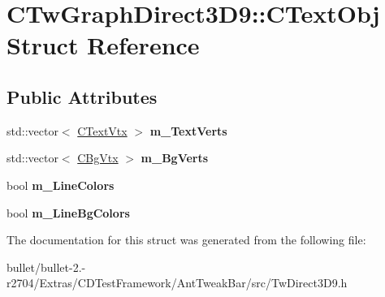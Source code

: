 \hypertarget{struct_c_tw_graph_direct3_d9_1_1_c_text_obj}{\section{C\+Tw\+Graph\+Direct3\+D9\+:\+:C\+Text\+Obj Struct Reference}
\label{struct_c_tw_graph_direct3_d9_1_1_c_text_obj}
}
\subsection*{Public Attributes}
\begin{DoxyCompactItemize}
\item 
\hypertarget{struct_c_tw_graph_direct3_d9_1_1_c_text_obj_a95426ab1f9d1fb9fe9de326e4a86d603}{std\+::vector$<$ \hyperlink{struct_c_tw_graph_direct3_d9_1_1_c_text_vtx}{C\+Text\+Vtx} $>$ {\bfseries m\+\_\+\+Text\+Verts}}\label{struct_c_tw_graph_direct3_d9_1_1_c_text_obj_a95426ab1f9d1fb9fe9de326e4a86d603}

\item 
\hypertarget{struct_c_tw_graph_direct3_d9_1_1_c_text_obj_ade5a86edd4ec801be4ddb46e9acc6178}{std\+::vector$<$ \hyperlink{struct_c_tw_graph_direct3_d9_1_1_c_bg_vtx}{C\+Bg\+Vtx} $>$ {\bfseries m\+\_\+\+Bg\+Verts}}\label{struct_c_tw_graph_direct3_d9_1_1_c_text_obj_ade5a86edd4ec801be4ddb46e9acc6178}

\item 
\hypertarget{struct_c_tw_graph_direct3_d9_1_1_c_text_obj_a95fb558260b5b98874e1d8e0ab007299}{bool {\bfseries m\+\_\+\+Line\+Colors}}\label{struct_c_tw_graph_direct3_d9_1_1_c_text_obj_a95fb558260b5b98874e1d8e0ab007299}

\item 
\hypertarget{struct_c_tw_graph_direct3_d9_1_1_c_text_obj_a85a49b8c37f403afc45e29e47395b082}{bool {\bfseries m\+\_\+\+Line\+Bg\+Colors}}\label{struct_c_tw_graph_direct3_d9_1_1_c_text_obj_a85a49b8c37f403afc45e29e47395b082}

\end{DoxyCompactItemize}


The documentation for this struct was generated from the following file\+:\begin{DoxyCompactItemize}
\item 
bullet/bullet-\/2.-\/r2704/\+Extras/\+C\+D\+Test\+Framework/\+Ant\+Tweak\+Bar/src/Tw\+Direct3\+D9.\+h\end{DoxyCompactItemize}
